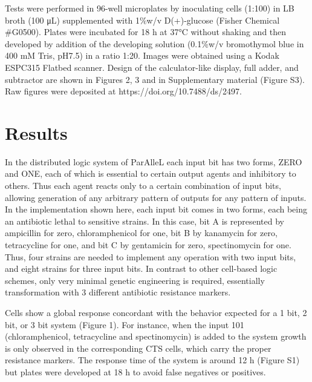 Tests were performed in 96-well microplates by inoculating cells (1:100) in LB broth (100 μL) supplemented with 1\%w/v D(+)-glucose (Fisher Chemical \#G0500). Plates were incubated for 18 h at 37°C without shaking and then developed by addition of the developing solution (0.1\%w/v bromothymol blue in 400 mM Tris, pH7.5) in a ratio 1:20. Images were obtained using a Kodak ESPC315 Flatbed scanner. Design of the calculator-like display, full adder, and subtractor are shown in Figures 2, 3 and in Supplementary material (Figure S3). Raw figures were deposited at https://doi.org/10.7488/ds/2497.

\section{\textbf{Results}}

In the distributed logic system of ParAlleL each input bit has two forms, ZERO and ONE, each of which is essential to certain output agents and inhibitory to others. Thus each agent reacts only to a certain combination of input bits, allowing generation of any arbitrary pattern of outputs for any pattern of inputs. In the implementation shown here, each input bit comes in two forms, each being an antibiotic lethal to sensitive strains. In this case, bit A is represented by ampicillin for zero, chloramphenicol for one, bit B by kanamycin for zero, tetracycline for one, and bit C by gentamicin for zero, spectinomycin for one. Thus, four strains are needed to implement any operation with two input bits, and eight strains for three input bits. In contrast to other cell-based logic schemes, only very minimal genetic engineering is required, essentially transformation with 3 different antibiotic resistance markers.

Cells show a global response concordant with the behavior expected for a 1 bit, 2 bit, or 3 bit system (Figure 1). For instance, when the input 101 (chloramphenicol, tetracycline and spectinomycin) is added to the system growth is only observed in the corresponding CTS cells, which carry the proper resistance markers. The response time of the system is around 12 h (Figure S1) but plates were developed at 18 h to avoid false negatives or positives.

